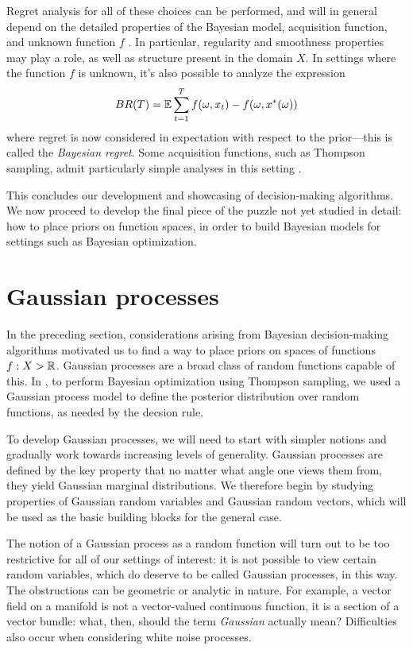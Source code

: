 \documentclass[11pt]{book}
\begin{document}
Regret analysis for all of these choices can be performed, and will in general depend on the detailed properties of the Bayesian model, acquisition function, and unknown function $f$ \cite{srinivas09}.
In particular, regularity and smoothness properties may play a role, as well as structure present in the domain $X$.
In settings where the function $f$ is unknown, it's also possible to analyze the expression 
\[
BR(T) = \operatorname{\mathbb{E}} \sum_{t=1}^T f(\omega,x_t) - f(\omega,x^*(\omega))    
\]
where regret is now considered in expectation with respect to the prior---this is called the \emph{Bayesian regret}.
Some acquisition functions, such as Thompson sampling, admit particularly simple analyses in this setting \cite{lattimore20}.

This concludes our development and showcasing of decision-making algorithms.
We now proceed to develop the final piece of the puzzle not yet studied in detail: how to place priors on function spaces, in order to build Bayesian models for settings such as Bayesian optimization.

\section{Gaussian processes}

In the preceding section, considerations arising from Bayesian decision-making algorithms motivated us to find a way to place priors on spaces of functions $f : X \-> \mathbb{R}$.
Gaussian processes are a broad class of random functions capable of this.
In , to perform Bayesian optimization using Thompson sampling, we used a Gaussian process model to define the posterior distribution over random functions, as needed by the decsion rule.

To develop Gaussian processes, we will need to start with simpler notions and gradually work towards increasing levels of generality.
Gaussian processes are defined by the key property that no matter what angle one views them from, they yield Gaussian marginal distributions.
We therefore begin by studying properties of Gaussian random variables and Gaussian random vectors, which will be used as the basic building blocks for the general case.

The notion of a Gaussian process as a random function will turn out to be too restrictive for all of our settings of interest: it is not possible to view certain random variables, which do deserve to be called Gaussian processes, in this way.
The obstructions can be geometric or analytic in nature.
For example, a vector field on a manifold is not a vector-valued continuous function, it is a section of a vector bundle: what, then, should the term \emph{Gaussian} actually mean?
Difficulties also occur when considering white noise processes.
\end{document}
